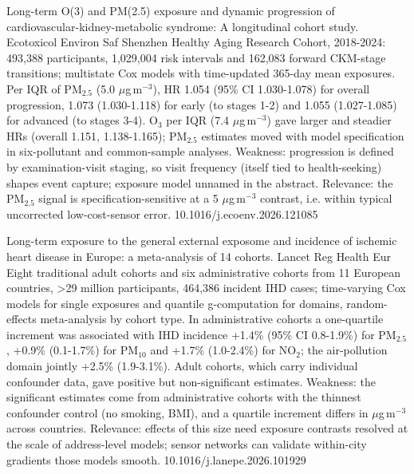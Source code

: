 \documentclass[10pt]{article}
\begin{document}
\par{}\baselineskip{}\baselineskip
{}

{Long-term O(3) and PM(2.5) exposure and dynamic progression of cardiovascular-kidney-metabolic syndrome: A longitudinal cohort study.}
{Ecotoxicol Environ Saf}
{Shenzhen Healthy Aging Research Cohort, 2018-2024: 493,388 participants, 1,029,004 risk intervals and 162,083 forward CKM-stage transitions; multistate Cox models with time-updated 365-day mean exposures. Per IQR of PM$_{2.5}$ (5.0 $\mu$g\,m$^{-3}$), HR 1.054 (95\% CI 1.030-1.078) for overall progression, 1.073 (1.030-1.118) for early (to stages 1-2) and 1.055 (1.027-1.085) for advanced (to stages 3-4). O$_3$ per IQR (7.4 $\mu$g\,m$^{-3}$) gave larger and steadier HRs (overall 1.151, 1.138-1.165); PM$_{2.5}$ estimates moved with model specification in six-pollutant and common-sample analyses. Weakness: progression is defined by examination-visit staging, so visit frequency (itself tied to health-seeking) shapes event capture; exposure model unnamed in the abstract. Relevance: the PM$_{2.5}$ signal is specification-sensitive at a 5 $\mu$g\,m$^{-3}$ contrast, i.e. within typical uncorrected low-cost-sensor error.}
{10.1016/j.ecoenv.2026.121085}

{Long-term exposure to the general external exposome and incidence of ischemic heart disease in Europe: a meta-analysis of 14 cohorts.}
{Lancet Reg Health Eur}
{Eight traditional adult cohorts and six administrative cohorts from 11 European countries, >29 million participants, 464,386 incident IHD cases; time-varying Cox models for single exposures and quantile g-computation for domains, random-effects meta-analysis by cohort type. In administrative cohorts a one-quartile increment was associated with IHD incidence +1.4\% (95\% CI 0.8-1.9\%) for PM$_{2.5}$, +0.9\% (0.1-1.7\%) for PM$_{10}$ and +1.7\% (1.0-2.4\%) for NO$_2$; the air-pollution domain jointly +2.5\% (1.9-3.1\%). Adult cohorts, which carry individual confounder data, gave positive but non-significant estimates. Weakness: the significant estimates come from administrative cohorts with the thinnest confounder control (no smoking, BMI), and a quartile increment differs in $\mu$g\,m$^{-3}$ across countries. Relevance: effects of this size need exposure contrasts resolved at the scale of address-level models; sensor networks can validate within-city gradients those models smooth.}
{10.1016/j.lanepe.2026.101929}
\end{document}
